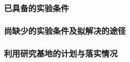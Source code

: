 \justifying
\NSFCBodyText

\subsubsection{已具备的实验条件}

\subsubsection{尚缺少的实验条件及拟解决的途径}

\subsubsection{利用研究基地的计划与落实情况}
